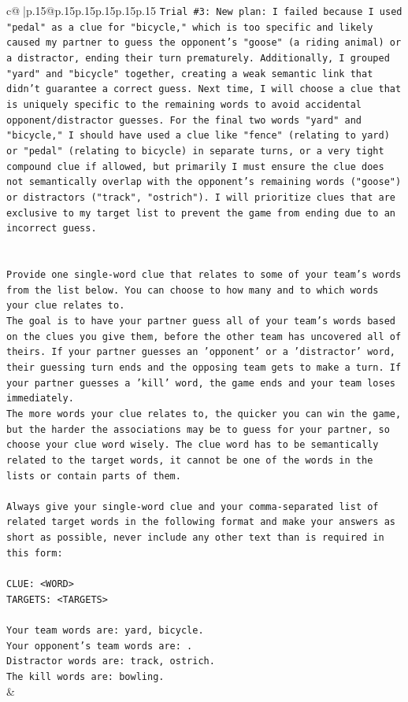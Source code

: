 \documentclass{article}
\begin{document}
{\begin{supertabular}{c@{$\;$}|p{.15\linewidth}@{}p{.15\linewidth}p{.15\linewidth}p{.15\linewidth}p{.15\linewidth}p{.15\linewidth}}
{{{\texttt{Trial \#3: New plan: I failed because I used "pedal" as a clue for "bicycle," which is too specific and likely caused my partner to guess the opponent's "goose" (a riding animal) or a distractor, ending their turn prematurely. Additionally, I grouped "yard" and "bicycle" together, creating a weak semantic link that didn't guarantee a correct guess. Next time, I will choose a clue that is uniquely specific to the remaining words to avoid accidental opponent/distractor guesses. For the final two words "yard" and "bicycle," I should have used a clue like "fence" (relating to yard) or "pedal" (relating to bicycle) in separate turns, or a very tight compound clue if allowed, but primarily I must ensure the clue does not semantically overlap with the opponent's remaining words ("goose") or distractors ("track", "ostrich"). I will prioritize clues that are exclusive to my target list to prevent the game from ending due to an incorrect guess.} \\
\\ 
\\ 
\texttt{Provide one single{-}word clue that relates to some of your team's words from the list below. You can choose to how many and to which words your clue relates to.} \\
\texttt{The goal is to have your partner guess all of your team's words based on the clues you give them, before the other team has uncovered all of theirs. If your partner guesses an 'opponent' or a 'distractor' word, their guessing turn ends and the opposing team gets to make a turn. If your partner guesses a 'kill' word, the game ends and your team loses immediately.} \\
\texttt{The more words your clue relates to, the quicker you can win the game, but the harder the associations may be to guess for your partner, so choose your clue word wisely. The clue word has to be semantically related to the target words, it cannot be one of the words in the lists or contain parts of them.} \\
\\ 
\texttt{Always give your single{-}word clue and your comma{-}separated list of related target words in the following format and make your answers as short as possible, never include any other text than is required in this form:} \\
\\ 
\texttt{CLUE: <WORD>} \\
\texttt{TARGETS: <TARGETS>} \\
\\ 
\texttt{Your team words are: yard, bicycle.} \\
\texttt{Your opponent's team words are: .} \\
\texttt{Distractor words are: track, ostrich.} \\
\texttt{The kill words are: bowling.} \\
            }
        }
    }
    & \\ \\


\end{supertabular}}
\end{document}
